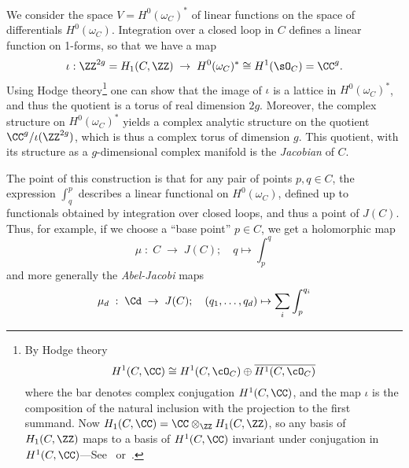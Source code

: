 We consider the space $V = H^0(\omega_C)^*$ of linear functions on the space of differentials $H^0(\omega_C)$.  Integration over a closed loop in $C$ defines a linear function on 1-forms, so that we have a map
$$
\iota: \ZZ^{2g} = H_1(C,\ZZ) \; \to \;  H^0(\omega_C)^* \cong H^1(\sO_C) = \CC^{g}.
$$
Using  Hodge theory\footnote{By Hodge theory 
$$
H^1(C, \CC) \cong H^1(C, \cO_C) \oplus \overline{H^1(C, \cO_C)}
$$
where the bar denotes complex conjugation $H^1(C, \CC)$, and the map $\iota$ is the composition of 
 the natural inclusion with the projection to the first summand.
 Now
$H_1(C,\CC) = \CC\otimes_\ZZ H_1(C,\ZZ)$, so any basis of $H_1(C,\ZZ)$ maps to a basis of 
 $H^1(C, \CC)$ invariant under conjugation in $H^1(C, \CC)$---See~\cite{Voisin} or~\cite{Griffiths-Harris1978}. 
}
one can show that the image of $\iota$ is a lattice in $H^0(\omega_C)^*$, and thus the quotient
is a torus of real dimension $2g$. Moreover, the
complex structure on $H^0(\omega_C)^*$ yields a complex analytic structure on the quotient $\CC^{g}/\iota(\ZZ^{2g})$, which is thus a complex torus of  dimension $g$.  This quotient, with its structure as a $g$-dimensional complex manifold is the \emph{Jacobian} of $C$.

The point of this construction is that for any pair of points $p, q \in C$, the expression $\int_q^p$ describes a linear functional on $H^0(\omega_C)$, defined up to functionals obtained by integration over closed loops, and thus a point of $J(C)$. Thus, for example, if we choose a ``base point''  $p\in C$, we get a holomorphic map
$$
\mu \; : \; C \; \to \; J(C); \quad q\mapsto \int_{p}^{q}
$$
and more generally the \emph{Abel-Jacobi} maps
$$
\mu_d \; : \; \Cd \; \to \; J(C); \quad (q_1,\dots, q_d) \mapsto \sum_i \int_{p}^{q_i}
$$

%

